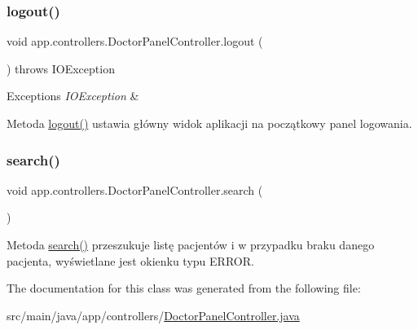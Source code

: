 \subsubsection{\texorpdfstring{logout()}{logout()}}
{\footnotesize\ttfamily void app.\+controllers.\+Doctor\+Panel\+Controller.\+logout (\begin{DoxyParamCaption}{ }\end{DoxyParamCaption}) throws I\+O\+Exception}


\begin{DoxyExceptions}{Exceptions}
{\em I\+O\+Exception} & \\
\hline
\end{DoxyExceptions}
Metoda \mbox{\hyperlink{classapp_1_1controllers_1_1_doctor_panel_controller_a1e3355f76eb264a960f7e88694d21478}{logout()}} ustawia główny widok aplikacji na początkowy panel logowania. \mbox{\label{classapp_1_1controllers_1_1_doctor_panel_controller_a0417501b80b9148596978de451424b88}} 
\subsubsection{\texorpdfstring{search()}{search()}}
{\footnotesize\ttfamily void app.\+controllers.\+Doctor\+Panel\+Controller.\+search (\begin{DoxyParamCaption}{ }\end{DoxyParamCaption})}

Metoda \mbox{\hyperlink{classapp_1_1controllers_1_1_doctor_panel_controller_a0417501b80b9148596978de451424b88}{search()}} przeszukuje listę pacjentów i w przypadku braku danego pacjenta, wyświetlane jest okienku typu E\+R\+R\+OR. 

The documentation for this class was generated from the following file\+:\begin{DoxyCompactItemize}
\item 
src/main/java/app/controllers/\mbox{\hyperlink{_doctor_panel_controller_8java}{Doctor\+Panel\+Controller.\+java}}\end{DoxyCompactItemize}
